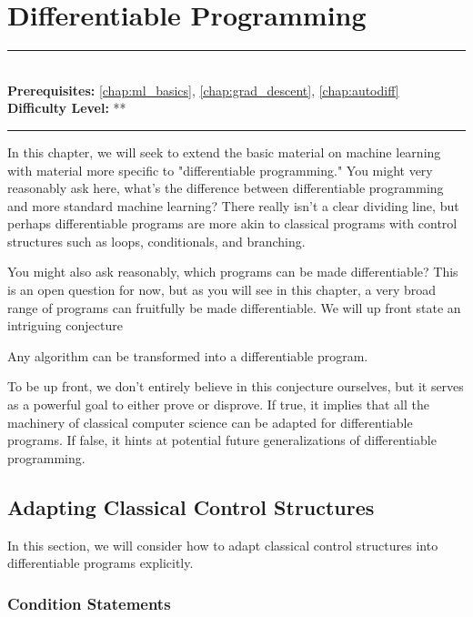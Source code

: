 \documentclass[book.tex]{subfiles}
\begin{document}
\chapter{Differentiable Programming}
\label{chap:diffprog}
\noindent\rule{11cm}{0.4pt} \\
\textbf{Prerequisites:}  \autoref{chap:ml_basics}, \autoref{chap:grad_descent}, \autoref{chap:autodiff}  \\
\textbf{Difficulty Level:} ** \\
\noindent\rule{11cm}{0.4pt}
\vspace{5mm}

In this chapter, we will seek to extend the basic material on machine learning with material more specific to "differentiable programming." You might very reasonably ask here, what's the difference between differentiable programming and more standard machine learning? There really isn't a clear dividing line, but perhaps differentiable programs are more akin to classical programs with control structures such as loops, conditionals, and branching.

You might also ask reasonably, which programs can be made differentiable? This is an open question for now, but as you will see in this chapter, a very broad range of programs can fruitfully be made differentiable. We will up front state an intriguing conjecture

\begin{conjecture}
Any algorithm can be transformed into a differentiable program.
\end{conjecture}

To be up front, we don't entirely believe in this conjecture ourselves, but it serves as a powerful goal to either prove or disprove. If true, it implies that all the machinery of classical computer science can be adapted for differentiable programs. If false, it hints at potential future generalizations of differentiable programming.

\section{Adapting Classical Control Structures}

In this section, we will consider how to adapt classical control structures into differentiable programs explicitly. 

\subsection{Condition Statements}
\end{document}
